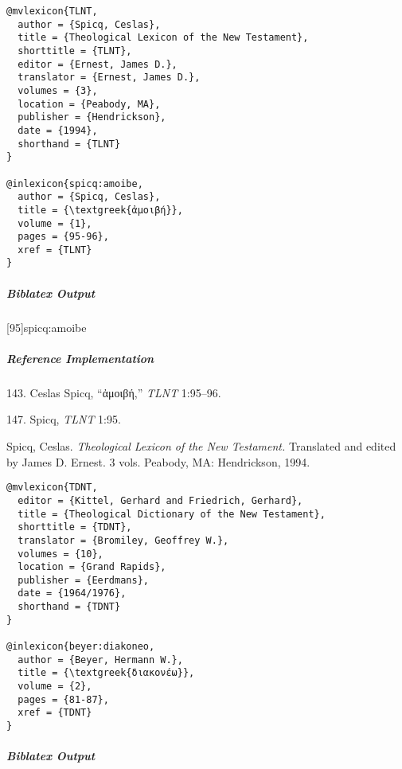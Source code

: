 \documentclass[a4paper]{article}
\newcommand{\textgreek}[1]{{\greekfont #1}}
\newenvironment{biboutput}{%
  \subparagraph{Biblatex Output}
}{\color{black}}
\newenvironment{refimp}{%
  \subparagraph{Reference Implementation}
  \color{reference-colour}
  \rm
}{\par\color{black}}
\begin{document}
\medskip

\begin{lstlisting}
@mvlexicon{TLNT,
  author = {Spicq, Ceslas},
  title = {Theological Lexicon of the New Testament},
  shorttitle = {TLNT},
  editor = {Ernest, James D.},
  translator = {Ernest, James D.},
  volumes = {3},
  location = {Peabody, MA},
  publisher = {Hendrickson},
  date = {1994},
  shorthand = {TLNT}
}

@inlexicon{spicq:amoibe,
  author = {Spicq, Ceslas},
  title = {\textgreek{ἀμοιβή}},
  volume = {1},
  pages = {95-96},
  xref = {TLNT}
}
\end{lstlisting}

\begin{biboutput}
  [95]{spicq:amoibe}
\end{biboutput}

\begin{refimp}
  143. Ceslas Spicq, “\textgreek{ἀμοιβή},” \emph{TLNT} 1:95–96.

  147. Spicq, \emph{TLNT} 1:95.

  \hangindent\bibindent Spicq, Ceslas. \emph{Theological Lexicon of the New
  Testament.} Translated and edited by James D. Ernest. 3 vols. Peabody, MA:
  Hendrickson, 1994.

\end{refimp}

\medskip

\begin{lstlisting}
@mvlexicon{TDNT,
  editor = {Kittel, Gerhard and Friedrich, Gerhard},
  title = {Theological Dictionary of the New Testament},
  shorttitle = {TDNT},
  translator = {Bromiley, Geoffrey W.},
  volumes = {10},
  location = {Grand Rapids},
  publisher = {Eerdmans},
  date = {1964/1976},
  shorthand = {TDNT}
}

@inlexicon{beyer:diakoneo,
  author = {Beyer, Hermann W.},
  title = {\textgreek{διακονέω}},
  volume = {2},
  pages = {81-87},
  xref = {TDNT}
}
\end{lstlisting}

\begin{biboutput}
\end{biboutput}
\end{document}

